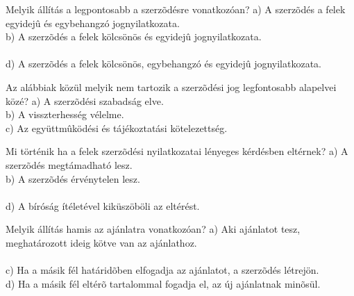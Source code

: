 \begin{frame}

\begin{tcolorbox}[title={148. Kérdés}]
Melyik állítás a legpontosabb a szerzõdésre vonatkozóan?
\tcblower
a) A szerzõdés a felek egyidejû és egybehangzó jognyilatkozata.\\
b) A szerzõdés a felek kölcsönös és egyidejû jognyilatkozata.\\
\\
d) A szerzõdés a felek kölcsönös, egybehangzó és egyidejû jognyilatkozata.
\end{tcolorbox}

\begin{tcolorbox}[title={149. Kérdés}]
Az alábbiak közül melyik nem tartozik a szerzõdési jog legfontosabb alapelvei közé?
\tcblower
a) A szerzõdési szabadság elve.\\
b) A visszterhesség vélelme.\\
c) Az együttmûködési és tájékoztatási kötelezettség.\\
\end{tcolorbox}

\begin{tcolorbox}[title={150. Kérdés}]
Mi történik ha a felek szerzõdési nyilatkozatai lényeges kérdésben eltérnek?
\tcblower
a) A szerzõdés megtámadható lesz.\\
b) A szerzõdés érvénytelen lesz.\\
\\
d) A bíróság ítéletével kiküszöböli az eltérést.
\end{tcolorbox}

\begin{tcolorbox}[title={151. Kérdés}]
Melyik állítás hamis az ajánlatra vonatkozóan?
\tcblower
a) Aki ajánlatot tesz, meghatározott ideig kötve van az ajánlathoz.\\
\\
c) Ha a másik fél határidõben elfogadja az ajánlatot, a szerzõdés létrejön.\\
d) Ha a másik fél eltérõ tartalommal fogadja el, az új ajánlatnak minõsül.
\end{tcolorbox}

\end{frame}


